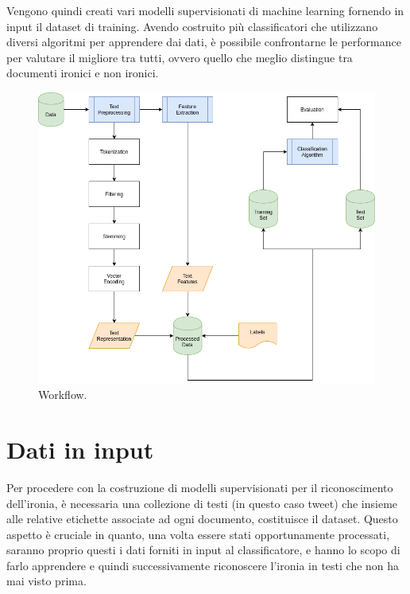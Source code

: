 \documentclass[oneside]{book}
\begin{document}
Vengono quindi creati vari modelli supervisionati di machine learning fornendo in input il dataset di training. Avendo costruito più classificatori che utilizzano diversi algoritmi per apprendere dai dati, è possibile confrontarne le performance per valutare il migliore tra tutti, ovvero quello che meglio distingue tra documenti ironici e non ironici.

\begin{figure}
	\includegraphics[width=\linewidth]{assets/Workflow.png}
	\caption{Workflow.}
	\label{fig:workflow}
\end{figure}


\clearpage

\section{Dati in input}

Per procedere con la costruzione di modelli supervisionati per il riconoscimento dell'ironia, è necessaria una collezione di testi (in questo caso tweet) che insieme alle relative etichette associate ad ogni documento, costituisce il dataset. Questo aspetto è cruciale in quanto, una volta essere stati opportunamente processati, saranno proprio questi i dati forniti in input al classificatore, e hanno lo scopo di farlo apprendere e quindi successivamente riconoscere l'ironia in testi che non ha mai visto prima.
\end{document}

